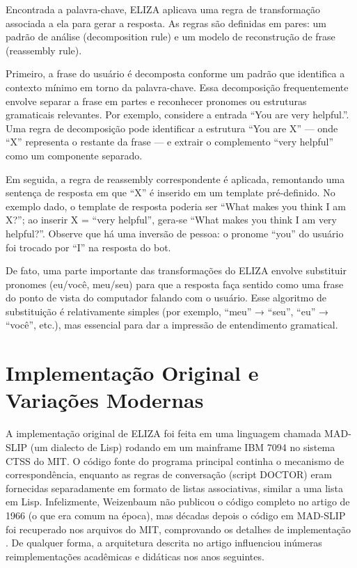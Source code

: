 \documentclass[14pt,a4paper,oneside]{book}
\begin{document}
Encontrada a palavra-chave, ELIZA aplicava uma regra de transformação associada a ela para gerar a resposta. As regras são definidas em pares: um padrão de análise (decomposition rule) e um modelo de reconstrução de frase (reassembly rule).

Primeiro, a frase do usuário é decomposta conforme um padrão que identifica a contexto mínimo em torno da palavra-chave. Essa decomposição frequentemente envolve separar a frase em partes e reconhecer pronomes ou estruturas gramaticais relevantes. Por exemplo, considere a entrada “You are very helpful.”. Uma regra de decomposição pode identificar a estrutura “You are X” — onde “X” representa o restante da frase — e extrair o complemento “very helpful” como um componente separado.

Em seguida, a regra de reassembly correspondente é aplicada, remontando uma sentença de resposta em que “X” é inserido em um template pré-definido. No exemplo dado, o template de resposta poderia ser “What makes you think I am X?”; ao inserir X = “very helpful”, gera-se “What makes you think I am very helpful?”. Observe que há uma inversão de pessoa: o pronome “you” do usuário foi trocado por “I” na resposta do bot.

De fato, uma parte importante das transformações do ELIZA envolve substituir pronomes (eu/você, meu/seu) para que a resposta faça sentido como uma frase do ponto de vista do computador falando com o usuário. Esse algoritmo de substituição é relativamente simples (por exemplo, “meu” → “seu”, “eu” → “você”, etc.), mas essencial para dar a impressão de entendimento gramatical.

\section{Implementação Original e Variações Modernas}

A implementação original de ELIZA foi feita em uma linguagem chamada MAD-SLIP (um dialecto de Lisp) rodando em um mainframe IBM 7094 no sistema CTSS do MIT. O código fonte do programa principal continha o mecanismo de correspondência, enquanto as regras de conversação (script DOCTOR) eram fornecidas separadamente em formato de listas associativas, similar a uma lista em Lisp. Infelizmente, Weizenbaum não publicou o código completo no artigo de 1966 (o que era comum na época), mas décadas depois o código em MAD-SLIP foi recuperado nos arquivos do MIT, comprovando os detalhes de implementação \cite{Lane2025}. De qualquer forma, a arquitetura descrita no artigo influenciou inúmeras reimplementações acadêmicas e didáticas nos anos seguintes.
\end{document}
